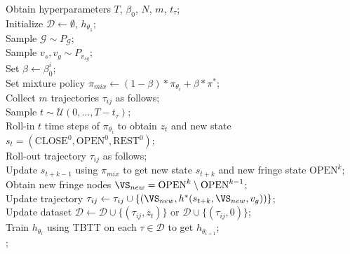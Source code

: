 \begin{algorithm}[t]
	\caption{\phil --- Sequential Heuristic Training}\label{alg:il_alg}
	Obtain hyperparameters $T$, $\beta_{0}$, $N$, $m$, $t_\tau$;\\
	Initialize $\mathcal{D} \leftarrow \emptyset$, $h_{\theta_{1}}$; \\ \label{lst:line:}
	{   Sample $\mathcal{G} \sim P_{\mathcal{G}}$; \\
	    Sample $v_s, v_g \sim P_{v_{sg}}$; \\
	    Set $\beta \leftarrow \beta_0^{i}$; \\
        Set mixture policy $\pi_{mix} \leftarrow (1 - \beta) * \pi_{\theta_{i}} + \beta  * \pi^{*}$; \\
	    Collect $m$ trajectories $\tau_{ij}$ as follows; \\
		{   
			Sample $t \sim \mathcal{U}(0, ..., T - t_{\tau})$;\\
			Roll-in $t$ time steps of $\pi_{\theta_{i}}$ to obtain $z_t$ and new state $s_t = (\text{CLOSE}^{0}, \text{OPEN}^{0}, \text{REST}^{0})$; \\
			Roll-out trajectory $\tau_{ij}$ as follows;\\
		    {   
    			Update $s_{t + k - 1}$ using $\pi_{mix}$ to get new state $s_{t+k}$ and new fringe state $\text{OPEN}^{k}$; \\
    			Obtain new fringe nodes $\VS_{new} = \text{OPEN}^{k} \setminus \text{OPEN}^{k-1}$; \\
    			Update trajectory $\tau_{ij} \leftarrow \tau_{ij} \cup \{(\VS_{new}, h^{*}(s_{t+k}, \VS_{new}, v_g))\}$; \\
	        }
		    Update dataset $\mathcal{D} \leftarrow \mathcal{D} \cup \{(\tau_{ij}, z_t)\}$ or $\mathcal{D} \cup \{(\tau_{ij}, 0)\}$; \\	
	    }
	    Train $h_{\theta_{i}}$ using TBTT on each $\tau \in \mathcal{D}$ to get $h_{\theta_{i+1}}$;\\  
	}
	;
\end{algorithm}


